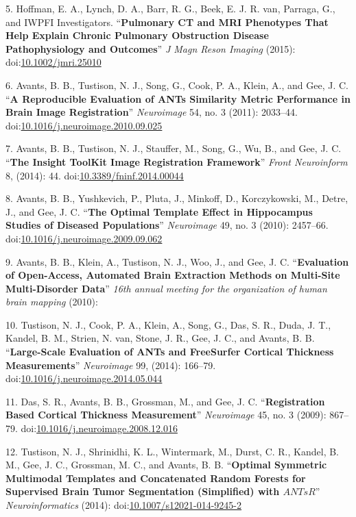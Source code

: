 \documentclass[11pt,]{article}
\begin{document}
5. Hoffman, E. A., Lynch, D. A., Barr, R. G., Beek, E. J. R. van,
Parraga, G., and IWPFI Investigators. ``\textbf{Pulmonary CT and MRI
Phenotypes That Help Explain Chronic Pulmonary Obstruction Disease
Pathophysiology and Outcomes}'' \emph{J Magn Reson Imaging} (2015):
doi:\href{http://dx.doi.org/10.1002/jmri.25010}{10.1002/jmri.25010}

6. Avants, B. B., Tustison, N. J., Song, G., Cook, P. A., Klein, A., and
Gee, J. C. ``\textbf{A Reproducible Evaluation of ANTs Similarity Metric
Performance in Brain Image Registration}'' \emph{Neuroimage} 54, no. 3
(2011): 2033--44.
doi:\href{http://dx.doi.org/10.1016/j.neuroimage.2010.09.025}{10.1016/j.neuroimage.2010.09.025}

7. Avants, B. B., Tustison, N. J., Stauffer, M., Song, G., Wu, B., and
Gee, J. C. ``\textbf{The Insight ToolKit Image Registration Framework}''
\emph{Front Neuroinform} 8, (2014): 44.
doi:\href{http://dx.doi.org/10.3389/fninf.2014.00044}{10.3389/fninf.2014.00044}

8. Avants, B. B., Yushkevich, P., Pluta, J., Minkoff, D., Korczykowski,
M., Detre, J., and Gee, J. C. ``\textbf{The Optimal Template Effect in
Hippocampus Studies of Diseased Populations}'' \emph{Neuroimage} 49, no.
3 (2010): 2457--66.
doi:\href{http://dx.doi.org/10.1016/j.neuroimage.2009.09.062}{10.1016/j.neuroimage.2009.09.062}

9. Avants, B. B., Klein, A., Tustison, N. J., Woo, J., and Gee, J. C.
``\textbf{Evaluation of Open-Access, Automated Brain Extraction Methods
on Multi-Site Multi-Disorder Data}'' \emph{16th annual meeting for the
organization of human brain mapping} (2010):

10. Tustison, N. J., Cook, P. A., Klein, A., Song, G., Das, S. R., Duda,
J. T., Kandel, B. M., Strien, N. van, Stone, J. R., Gee, J. C., and
Avants, B. B. ``\textbf{Large-Scale Evaluation of ANTs and FreeSurfer
Cortical Thickness Measurements}'' \emph{Neuroimage} 99, (2014):
166--79.
doi:\href{http://dx.doi.org/10.1016/j.neuroimage.2014.05.044}{10.1016/j.neuroimage.2014.05.044}

11. Das, S. R., Avants, B. B., Grossman, M., and Gee, J. C.
``\textbf{Registration Based Cortical Thickness Measurement}''
\emph{Neuroimage} 45, no. 3 (2009): 867--79.
doi:\href{http://dx.doi.org/10.1016/j.neuroimage.2008.12.016}{10.1016/j.neuroimage.2008.12.016}

12. Tustison, N. J., Shrinidhi, K. L., Wintermark, M., Durst, C. R.,
Kandel, B. M., Gee, J. C., Grossman, M. C., and Avants, B. B.
``\textbf{Optimal Symmetric Multimodal Templates and Concatenated Random
Forests for Supervised Brain Tumor Segmentation (Simplified) with
$ANTsR$}'' \emph{Neuroinformatics} (2014):
doi:\href{http://dx.doi.org/10.1007/s12021-014-9245-2}{10.1007/s12021-014-9245-2}
\end{document}
